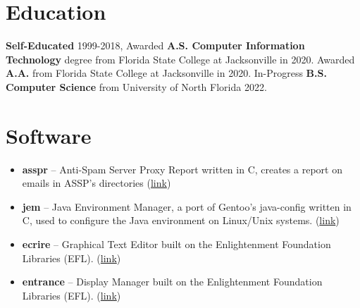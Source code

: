 \documentclass[10pt]{report}
\begin{document}
\section*{Education}
\textbf{Self-Educated} 1999-2018, Awarded \textbf{A.S. Computer Information Technology} degree from Florida State College at Jacksonville in 2020. Awarded \textbf{A.A.} from Florida State College at Jacksonville in 2020. In-Progress \textbf{B.S. Computer Science} from University of North Florida 2022.

\section*{Software}
\begin{itemize}
  \item \textbf{asspr} – Anti-Spam Server Proxy Report written in C, creates a report on emails in ASSP's directories (\href{https://github.com/Obsidian-StudiosInc/asspr}{link})
  \item \textbf{jem} – Java Environment Manager, a port of Gentoo's java-config written in C, used to configure the Java environment on Linux/Unix systems. (\href{https://github.com/Obsidian-StudiosInc/jem}{link})
  \item \textbf{ecrire} – Graphical Text Editor built on the Enlightenment Foundation Libraries (EFL). (\href{https://github.com/Obsidian-StudiosInc/ecrire}{link})
  \item \textbf{entrance} – Display Manager built on the Enlightenment Foundation Libraries (EFL). (\href{https://github.com/Obsidian-StudiosInc/entrance}{link})
\end{itemize}  
\end{document}
